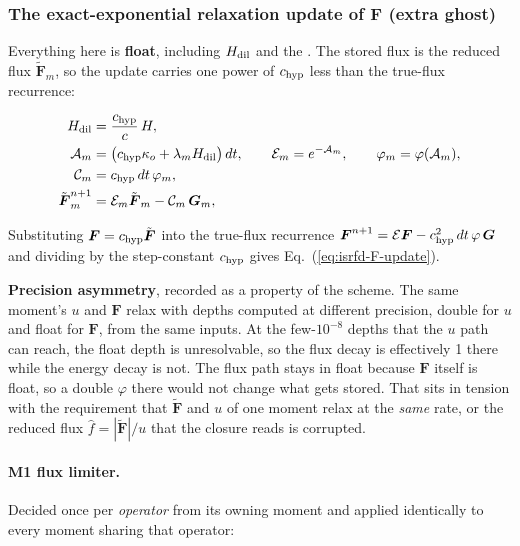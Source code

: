 \subsubsection{The exact-exponential relaxation update of $\boldsymbol{F}$ (extra ghost)}
\label{sec:isrf-eqdisc-F-update}

Everything here is \textbf{float},
including $H_{\rm dil}$ and the . The stored flux is the reduced flux
$\tilde{\boldsymbol{F}}_m$, so the update carries one power of $c_{\rm hyp}$
less than the true-flux recurrence:

\begin{align}
  H_{\rm dil} &= \frac{c_{\rm hyp}}{c}\, H,
  \label{eq:isrfd-Hdil-float} \\
  \mathcal{A}_m &= \big(c_{\rm hyp}\kappa_o + \lambda_m H_{\rm dil}\big)\, dt,
  \qquad
  \mathcal{E}_m = e^{-\mathcal{A}_m},
  \qquad
  \varphi_m = \varphi(\mathcal{A}_m),
  \label{eq:isrfd-depth-F} \\
  \mathcal{C}_m &= c_{\rm hyp}\, dt\, \varphi_m,
  \label{eq:isrfd-coeff-F} \\
  \tilde{\boldsymbol{F}}_m^{n+1} &= \mathcal{E}_m \tilde{\boldsymbol{F}}_m
    - \mathcal{C}_m\, \boldsymbol{G}_m,
  \label{eq:isrfd-F-update}
\end{align}

Substituting
$\boldsymbol{F} = c_{\rm hyp}\tilde{\boldsymbol{F}}$ into the true-flux recurrence
$\boldsymbol{F}^{n+1} = \mathcal{E}\boldsymbol{F} - c_{\rm hyp}^2\,dt\,\varphi\,
\boldsymbol{G}$ and dividing by the step-constant $c_{\rm hyp}$ gives
Eq.~(\ref{eq:isrfd-F-update}).

\textbf{Precision asymmetry}, recorded as a property of the scheme. The same
moment's $u$ and $\boldsymbol{F}$ relax with depths computed at different
precision, double for $u$ and float for $\boldsymbol{F}$, from the same inputs.
At the few-$10^{-8}$ depths
that the $u$ path can reach, the float depth
is unresolvable, so the flux decay is effectively 1 there while the energy decay
is not. The flux path stays in float because $\boldsymbol{F}$ itself is float, so
a double $\varphi$ there would not change what gets stored. That sits in tension
with the requirement that $\tilde{\boldsymbol{F}}$ and $u$ of one moment relax at
the \emph{same} rate, or the reduced flux
$\hat f = |\tilde{\boldsymbol{F}}|/u$ that the closure reads is corrupted.

\paragraph{M1 flux limiter.} Decided once per \emph{operator} from its owning
moment and applied identically to every
moment sharing that operator:

